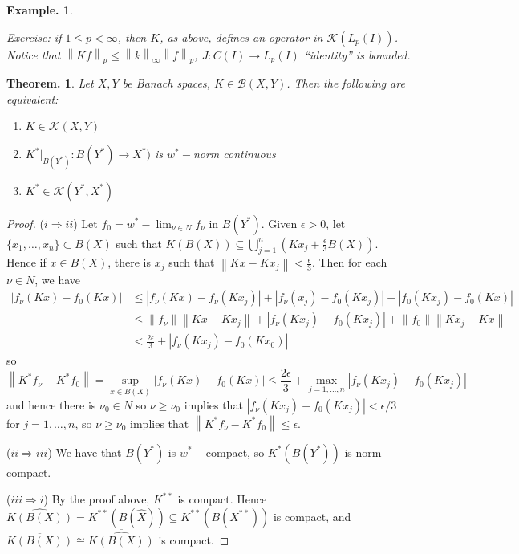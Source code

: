 \documentclass[11pt, a4paper]{memoir}
\newcommand{\imp}[2]{($#1\Rightarrow#2$)\hspace{0.2cm}}
\newcommand{\norm}[1]{\ensuremath{\left\lVert#1\right\rVert}}
\theoremstyle{change}
\newtheorem{theorem}{Theorem.}[section]
\theoremstyle{plain}
\theoremstyle{nonumberplain}
\newtheorem{example}{Example.}
\newtheorem{proof}{Proof}
\numberwithin{equation}{section}
\begin{document}
\begin{example}
\begin{enumerate}[nl,r]
            \textit{Exercise:} if $1\leq p<\infty$, then $K$, as above, defines an operator in $\mathcal{K}(L_p(I))$.
            Notice that $\norm{Kf}_p\leq\norm{k}_\infty\norm{f}_p$, $J:C(I)\to L_p(I)$ ``identity'' is bounded.
    \end{enumerate}
\end{example}
\begin{theorem}
    Let $X,Y$ be Banach spaces, $K\in\mathcal{B}(X,Y)$.
    Then the following are equivalent:
    \begin{enumerate}[nl,r]
        \item $K\in\mathcal{K}(X,Y)$
        \item $K^*|_{B(Y^*)}:B(Y^*)\to X^*)$ is $w^*-$norm continuous
        \item $K^*\in\mathcal{K}(Y^*,X^*)$
    \end{enumerate}
\end{theorem}
\begin{proof}
    \imp{i}{ii}
    Let $f_0=w^*-\lim_{\nu\in N}f_\nu$ in $B(Y^*)$.
    Given $\epsilon>0$, let $\{x_1,\ldots,x_n\}\subset B(X)$ such that $K(B(X))\subseteq\bigcup_{j=1}^n(Kx_j+\frac{\epsilon}{3}B(X))$.
    Hence if $x\in B(X)$, there is $x_j$ such that $\norm{Kx-Kx_j}<\frac{\epsilon}{3}$.
    Then for each $\nu\in N$, we have
    \begin{align*}
        |f_\nu(Kx)-f_0(Kx)| &\leq |f_\nu(Kx)-f_\nu(Kx_j)| + |f_\nu(x_j)-f_0(Kx_j)| + |f_0(Kx_j)-f_0(Kx)|\\
                            &\leq \norm{f_\nu}\norm{Kx-Kx_j}+|f_\nu(Kx_j)-f_0(Kx_j)|+\norm{f_0}\norm{Kx_j-Kx}\\
                            &< \frac{2\epsilon}{3}+|f_\nu(Kx_j)-f_0(Kx_0)|
    \end{align*}
    so
    \begin{equation*}
        \norm{K^*f_\nu-K^*f_0}=\sup_{x\in B(X)}|f_\nu(Kx)-f_0(Kx)|\leq\frac{2\epsilon}{3}+\max_{j=1,\ldots,n}|f_\nu(Kx_j)-f_0(Kx_j)|
    \end{equation*}
    and hence there is $\nu_0\in N$ so $\nu\geq\nu_0$ implies that $|f_\nu(Kx_j)-f_0(Kx_j)|<\epsilon/3$ for $j=1,\ldots,n$, so $\nu\geq \nu_0$ implies that $\norm{K^*f_\nu-K^*f_0}\leq\epsilon$.

    \imp{ii}{iii}
    We have that $B(Y^*)$ is $w^*-$compact, so $K^*(B(Y^*))$ is norm compact.

    \imp{iii}{i}
    By the proof above, $K^{**}$ is compact.
    Hence $\widehat{K(B(X))}=K^{**}(B(\hat X))\subseteq K^{**}(B(X^{**}))$ is compact, and $\overline{K(B(X))}\cong\overline{\widehat{K(B(X))}}$ is compact.
\end{proof}
\end{document}
